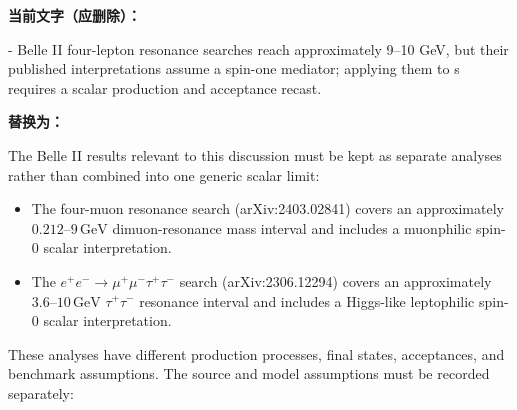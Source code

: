 \documentclass[
]{article}
\newenvironment{Shaded}{}{}
\newcommand{\StringTok}[1]{\textcolor[rgb]{0.25,0.44,0.63}{#1}}
\begin{document}
\textbf{当前文字（应删除）：}

\begin{Shaded}
\begin{Highlighting}[]
\StringTok{{-} Belle II four{-}lepton resonance searches reach approximately 9–10 GeV, but their published interpretations assume a spin{-}one mediator; applying them to s requires a scalar production and acceptance recast.}
\end{Highlighting}
\end{Shaded}

\textbf{替换为：}

 The Belle II results relevant to this discussion must be kept as
separate analyses rather than combined into one generic scalar limit:

\begin{itemize}
    \item The four-muon resonance search (arXiv:2403.02841) covers an
    approximately \(0.212\text{--}9\,\mathrm{GeV}\) dimuon-resonance mass
    interval and includes a muonphilic spin-0 scalar interpretation.

    \item The \(e^+e^-\to\mu^+\mu^-\tau^+\tau^-\) search
    (arXiv:2306.12294) covers an approximately
    \(3.6\text{--}10\,\mathrm{GeV}\) \(\tau^+\tau^-\) resonance interval
    and includes a Higgs-like leptophilic spin-0 scalar interpretation.
\end{itemize}

These analyses have different production processes, final states,
acceptances, and benchmark assumptions. The source and model assumptions
must be recorded separately:
\end{document}
